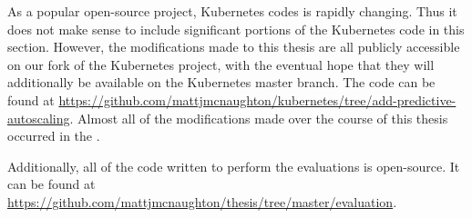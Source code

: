 As a popular open-source project, Kubernetes codes is rapidly changing. Thus it
does not make sense to include significant portions of the Kubernetes code in
this section. However, the modifications made to this thesis are all publicly
accessible on our fork of the Kubernetes project, with the eventual hope that
they will additionally be available on the Kubernetes master branch. The code
can be found at
\url{https://github.com/mattjmcnaughton/kubernetes/tree/add-predictive-autoscaling}.
Almost all of the modifications made over the course of this thesis occurred in
the .

Additionally, all of the code written to perform the evaluations is open-source.
It can be found at
\url{https://github.com/mattjmcnaughton/thesis/tree/master/evaluation}.

